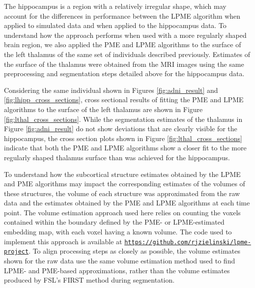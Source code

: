 \documentclass[12pt]{article}
\theoremstyle{definition}
\begin{document}
The hippocampus is a region with a relatively irregular shape, which may account for the differences in performance between the LPME algorithm when applied to simulated data and when applied to the hippocampus data. To understand how the approach performs when used with a more regularly shaped brain region, we also applied the PME and LPME algorithms to the surface of the left thalamus of the same set of individuals described previously. Estimates of the surface of the thalamus were obtained from the MRI images using the same preprocessing and segmentation steps detailed above for the hippocampus data.

Considering the same individual shown in Figures \ref{fig:adni_result} and \ref{fig:lhipp_cross_sections}, cross sectional results of fitting the PME and LPME algorithms to the surface of the left thalamus are shown in Figure \ref{fig:lthal_cross_sections}. While the segmentation estimates of the thalamus in Figure \ref{fig:adni_result} do not show deviations that are clearly visible for the hippocampus, the cross section plots shown in Figure \ref{fig:lthal_cross_sections} indicate that both the PME and LPME algorithms show a closer fit to the more regularly shaped thalamus surface than was achieved for the hippocampus.

To understand how the subcortical structure estimates obtained by the LPME and PME algorithms may impact the corresponding estimates of the volumes of these structures, the volume of each structure was approximated from the raw data and the estimates obtained by the PME and LPME algorithms at each time point. The volume estimation approach used here relies on counting the voxels contained within the boundary defined by the PME- or LPME-estimated embedding map, with each voxel having a known volume.  The code used to implement this approach is available at \href{https://github.com/rjzielinski/lpme-project}{\texttt{https://github.com/rjzielinski/lpme-project}}. To align processing steps as closely as possible, the volume estimates shown for the raw data use the same volume estimation method used to find LPME- and PME-based approximations, rather than the volume estimates produced by FSL's FIRST method during segmentation.
\end{document}
